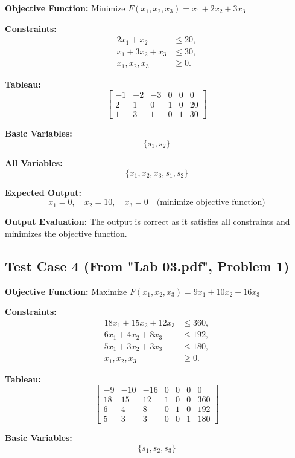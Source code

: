 \documentclass{article}
\begin{document}
\textbf{Objective Function:} Minimize \( F(x_1, x_2, x_3) = x_1 + 2x_2 + 3x_3 \)

\textbf{Constraints:}
\[
\begin{aligned}
2x_1 + x_2 &\leq 20, \\
x_1 + 3x_2 + x_3 &\leq 30, \\
x_1, x_2, x_3 &\geq 0.
\end{aligned}
\]

\textbf{Tableau:}
\[
\begin{bmatrix}
-1 & -2 & -3 & 0 & 0 & 0 \\
2 & 1 & 0 & 1 & 0 & 20 \\
1 & 3 & 1 & 0 & 1 & 30
\end{bmatrix}
\]

\textbf{Basic Variables:}
\[
\{ s_1, s_2 \}
\]

\textbf{All Variables:}
\[
\{ x_1, x_2, x_3, s_1, s_2 \}
\]

\textbf{Expected Output:}
\[
x_1 = 0, \quad x_2 = 10, \quad x_3 = 0 \quad \text{(minimize objective function)}
\]

\textbf{Output Evaluation:} The output is correct as it satisfies all constraints and minimizes the objective function.

\subsection*{Test Case 4 (From "Lab 03.pdf", Problem 1)}

\textbf{Objective Function:} Maximize \( F(x_1, x_2, x_3) = 9x_1 + 10x_2 + 16x_3 \)

\textbf{Constraints:}
\[
\begin{aligned}
18x_1 + 15x_2 + 12x_3 &\leq 360, \\
6x_1 + 4x_2 + 8x_3 &\leq 192, \\
5x_1 + 3x_2 + 3x_3 &\leq 180, \\
x_1, x_2, x_3 &\geq 0.
\end{aligned}
\]

\textbf{Tableau:}
\[
\begin{bmatrix}
-9 & -10 & -16 & 0 & 0 & 0 & 0 \\
18 & 15 & 12 & 1 & 0 & 0 & 360 \\
6 & 4 & 8 & 0 & 1 & 0 & 192 \\
5 & 3 & 3 & 0 & 0 & 1 & 180
\end{bmatrix}
\]

\textbf{Basic Variables:}
\[
\{ s_1, s_2, s_3 \}
\]
\end{document}
